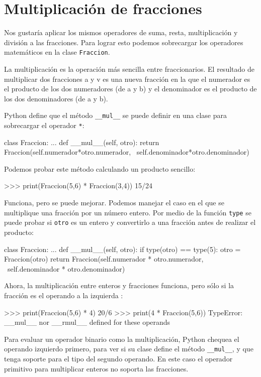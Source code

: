 \section{Multiplicación de fracciones}

 

Nos gustaría aplicar los mismos operadores de suma, resta, multiplicación
y división a las fracciones. Para lograr esto podemos sobrecargar
los operadores matemáticos en la clase \texttt{Fraccion}.

  

La multiplicación es la operación más sencilla entre fraccionarios.
El resultado de multiplicar dos fracciones a y v es una nueva fracción
en la que el numerador es el producto de los dos numeradores (de a
y b) y el denominador es el producto de los dos denominadores (de
a y b).

Python define que el método \texttt{\_\_mul\_\_} se puede definir
en una clase para sobrecargar el operador \texttt{{*}}:
\begin{pythoncode}
class Fraccion:
  ...
  def __mul__(self, otro):
    return Fraccion(self.numerador*otro.numerador, \
                    self.denominador*otro.denominador)
\end{pythoncode}

Podemos probar este método calculando un producto sencillo:
\begin{pythoncode}
>>> print(Fraccion(5,6) * Fraccion(3,4))
15/24
\end{pythoncode}

Funciona, pero se puede mejorar. Podemos manejar el caso en el que
se multiplique una fracción por un número entero. Por medio de la
función \texttt{type} se puede probar si \texttt{otro} es un entero
y convertirlo a una fracción antes de realizar el producto:
\begin{pythoncode}
class Fraccion:
  ...
  def __mul__(self, otro):
    if type(otro) == type(5):
      otro = Fraccion(otro)
    return Fraccion(self.numerador   * otro.numerador, \
                    self.denominador * otro.denominador)
\end{pythoncode}

Ahora, la multiplicación entre enteros y fracciones funciona, pero
sólo si la fracción es el operando a la izquierda :

\begin{pythoncode}
>>> print(Fraccion(5,6) * 4)
20/6
>>> print(4 * Fraccion(5,6))
TypeError: __mul__ nor __rmul__ defined for these operands
\end{pythoncode}
 Para evaluar un operador binario como la multiplicación, Python chequea
el operando izquierdo primero, para ver si su clase define el método
\texttt{\_\_mul\_\_}, y que tenga soporte para el tipo del segundo
operando. En este caso el operador primitivo para multiplicar enteros
no soporta las fracciones.

